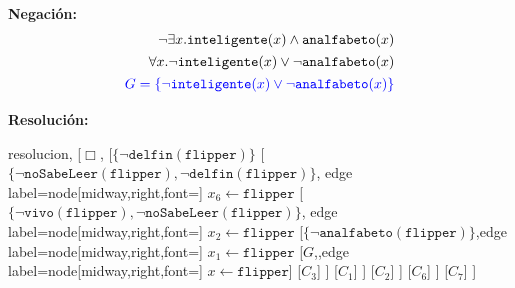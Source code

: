 \documentclass[10pt,a4paper]{article}
\begin{document}
\textbf{Negación:}
\begin{align*}
\lnot\exists x.\texttt{inteligente}(x)\land\texttt{analfabeto}(x)\\[1pt]
\forall x.\lnot\texttt{inteligente}(x)\lor\lnot\texttt{analfabeto}(x)\\[1pt]
{\color{blue}G = \{\lnot\texttt{inteligente}(x)\lor\lnot\texttt{analfabeto}(x)\}}\\[1pt]
\end{align*}

\textbf{Resolución:}
\begin{center}
	\begin{forest} resolucion,
[$\Box$,
    [$\{ \lnot \texttt{delfin}(\texttt{flipper})\}$
        [$\{\lnot \texttt{noSabeLeer}(\texttt{flipper})\comma \lnot \texttt{delfin}(\texttt{flipper})\}$, edge label={node[midway,right,font=\footnotesize] {$x_6\leftarrow \texttt{flipper}$}}
            [$\{\lnot \texttt{vivo}(\texttt{flipper})\comma \lnot \texttt{noSabeLeer}(\texttt{flipper})\}$, edge label={node[midway,right,font=\footnotesize] {$x_2\leftarrow \texttt{flipper}$}}
                [$\{\lnot \texttt{analfabeto}(\texttt{flipper})\}$,edge label={node[midway,right,font=\footnotesize] {$x_1\leftarrow \texttt{flipper}$}}
                    [$G$,,edge label={node[midway,right,font=\footnotesize] {$x\leftarrow \texttt{flipper}$}}]
                    [$C_3$]
                ]
                [$C_1$]
            ]
            [$C_2$]
        ]
        [$C_6$]
    ]
    [$C_7$]
]
	\end{forest}
\end{center}

\end{document}
